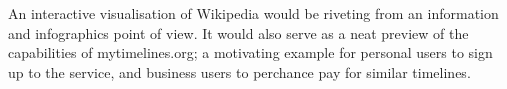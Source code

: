 An interactive visualisation of Wikipedia would be riveting from an 
information and infographics point of view. It would also serve as a neat 
preview of the capabilities of mytimelines.org; a motivating example for 
personal users to sign up to the service, and business users to perchance pay 
for similar timelines.
